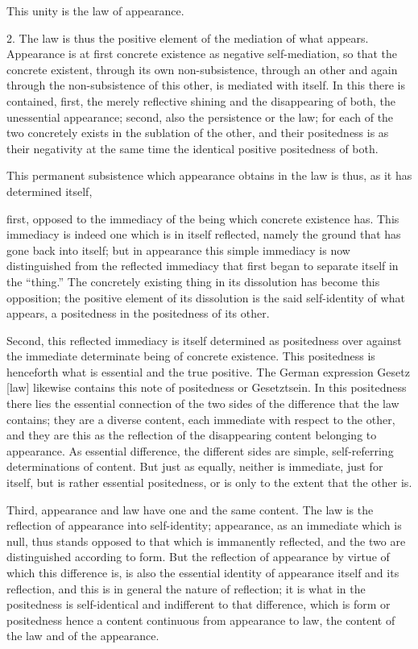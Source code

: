 This unity is the law of appearance.

2. The law is thus the positive element
of the mediation of what appears.
Appearance is at first concrete existence
as negative self-mediation,
so that the concrete existent,
through its own non-subsistence,
through an other and again through
the non-subsistence of this other,
is mediated with itself.
In this there is contained,
first, the merely reflective shining
and the disappearing of both,
the unessential appearance;
second, also the persistence or the law;
for each of the two concretely exists
in the sublation of the other,
and their positedness is as
their negativity at the same time
the identical positive positedness of both.

This permanent subsistence which appearance
obtains in the law is thus,
as it has determined itself,

first, opposed to the immediacy
of the being which concrete existence has.
This immediacy is indeed one which is in itself reflected,
namely the ground that has gone back into itself;
but in appearance this simple immediacy is now distinguished
from the reflected immediacy that first began
to separate itself in the “thing.”
The concretely existing thing in its dissolution
has become this opposition;
the positive element of its dissolution is
the said self-identity of what appears,
a positedness in the positedness of its other.

Second, this reflected immediacy is itself determined
as positedness over against the immediate determinate
being of concrete existence.
This positedness is henceforth what is essential
and the true positive.
The German expression Gesetz [law] likewise contains this
note of positedness or Gesetztsein.
In this positedness there lies the essential connection of
the two sides of the difference that the law contains;
they are a diverse content,
each immediate with respect to the other,
and they are this as the reflection of
the disappearing content belonging to appearance.
As essential difference, the different sides are
simple, self-referring determinations of content.
But just as equally, neither is immediate,
just for itself, but is rather essential positedness,
or is only to the extent that the other is.

Third, appearance and law have one and the same content.
The law is the reflection of appearance into self-identity;
appearance, as an immediate which is null,
thus stands opposed to that which is immanently reflected,
and the two are distinguished according to form.
But the reflection of appearance
by virtue of which this difference is,
is also the essential identity of
appearance itself and its reflection,
and this is in general the nature of reflection;
it is what in the positedness is self-identical
and indifferent to that difference,
which is form or positedness
hence a content continuous
from appearance to law,
the content of the law
and of the appearance.

